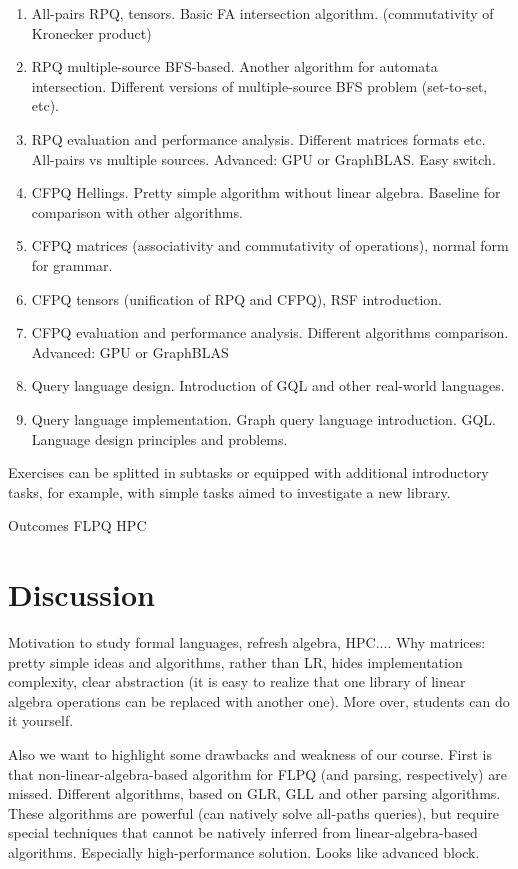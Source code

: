 \documentclass[sigconf]{acmart}
\begin{document}
\begin{enumerate}
  \item All-pairs RPQ, tensors. Basic FA intersection algorithm. (commutativity of Kronecker product)
  \item RPQ multiple-source BFS-based. Another algorithm for automata intersection. Different versions of multiple-source BFS problem (set-to-set, etc).  
  \item RPQ evaluation and performance analysis. Different matrices formats etc. All-pairs vs multiple sources. Advanced: GPU or GraphBLAS. Easy switch.
  \item CFPQ Hellings. Pretty simple algorithm without linear algebra. Baseline for comparison with other algorithms. 
  \item CFPQ matrices (associativity and commutativity of operations), normal form for grammar.
  \item CFPQ tensors (unification of RPQ and CFPQ), RSF introduction.
  \item CFPQ evaluation and performance analysis. Different algorithms comparison. Advanced: GPU or GraphBLAS 
  \item Query language design. Introduction of GQL and other real-world languages. 
  \item Query language implementation. Graph query language introduction. GQL. Language design principles and problems.
\end{enumerate}

Exercises can be splitted in subtasks or equipped with additional introductory tasks, for example, with simple tasks aimed to investigate a new library.

Outcomes 
FLPQ
HPC

\section{Discussion}

Motivation to study formal languages, refresh algebra, HPC....
Why matrices: pretty simple ideas and algorithms, rather than LR, hides implementation complexity, clear abstraction (it is easy to realize that one library of linear algebra operations can be replaced with another one). More over, students can do it yourself.

Also we want to highlight some drawbacks and weakness of our course.
First is that non-linear-algebra-based algorithm for FLPQ (and parsing, respectively) are missed. Different algorithms, based on GLR, GLL and other parsing algorithms. These algorithms are powerful (can natively solve all-paths queries), but require special techniques that cannot be natively inferred from linear-algebra-based algorithms. Especially high-performance solution. Looks like advanced block. 
\end{document}
